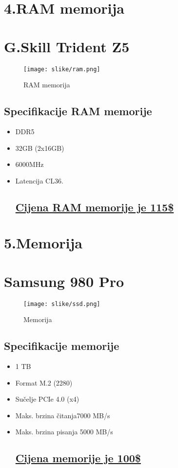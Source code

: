\documentclass[12pt]{article}
\begin{document}
\newpage
\section*{\Huge 4.RAM memorija}
\section*{\large G.Skill Trident Z5}
\begin{figure}[h]
    \centering
    \texttt{[image: slike/ram.png]} 
    \caption{RAM memorija}
\end{figure}
\subsection*{Specifikacije RAM memorije}
\begin{itemize}[label=--, left=0em]
    \item DDR5
    \item 32GB (2x16GB)
    \item 6000MHz
    \item Latencija CL36.
\subsection*{\href{https://www.newegg.com/g-skill-32gb-288-pin-ddr5-sdram/p/N82E16820374351}{Cijena RAM memorije je 115\$}}
\end{itemize}

\newpage
\section*{\Huge 5.Memorija}
\section*{\large Samsung 980 Pro}
\begin{figure}[h]
    \centering
    \texttt{[image: slike/ssd.png]} 
    \caption{Memorija}
\end{figure}
\subsection*{Specifikacije memorije}
\begin{itemize}[label=--, left=0em]
    \item 1 TB
    \item Format M.2 (2280)
    \item Sučelje PCIe 4.0 (x4)
    \item Maks. brzina čitanja7000 MB/s
    \item Maks. brzina pisanja 5000 MB/s
\subsection*{\href{https://www.newegg.com/samsung-1tb-980-pro/p/N82E16820147790}{Cijena memorije je 100\$}}
\end{itemize}
\end{document}

